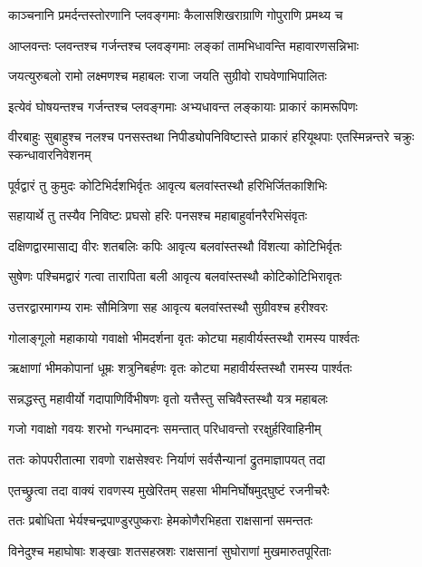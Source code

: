 \twolineshloka
{काञ्चनानि प्रमर्दन्तस्तोरणानि प्लवङ्गमाः}
{कैलासशिखराग्राणि गोपुराणि प्रमथ्य च} %

\twolineshloka
{आप्लवन्तः प्लवन्तश्च गर्जन्तश्च प्लवङ्गमाः}
{लङ्कां तामभिधावन्ति महावारणसन्निभाः} %

\twolineshloka
{जयत्युरुबलो रामो लक्ष्मणश्च महाबलः}
{राजा जयति सुग्रीवो राघवेणाभिपालितः} %

\twolineshloka
{इत्येवं घोषयन्तश्च गर्जन्तश्च प्लवङ्गमाः}
{अभ्यधावन्त लङ्कायाः प्राकारं कामरूपिणः} %

\threelineshloka
{वीरबाहुः सुबाहुश्च नलश्च पनसस्तथा}
{निपीड्योपनिविष्टास्ते प्राकारं हरियूथपाः}
{एतस्मिन्नन्तरे चक्रुः स्कन्धावारनिवेशनम्} %

\twolineshloka
{पूर्वद्वारं तु कुमुदः कोटिभिर्दशभिर्वृतः}
{आवृत्य बलवांस्तस्थौ हरिभिर्जितकाशिभिः} %

\twolineshloka
{सहायार्थे तु तस्यैव निविष्टः प्रघसो हरिः}
{पनसश्च महाबाहुर्वानरैरभिसंवृतः} %

\twolineshloka
{दक्षिणद्वारमासाद्य वीरः शतबलिः कपिः}
{आवृत्य बलवांस्तस्थौ विंशत्या कोटिभिर्वृतः} %

\twolineshloka
{सुषेणः पश्चिमद्वारं गत्वा तारापिता बली}
{आवृत्य बलवांस्तस्थौ कोटिकोटिभिरावृतः} %

\twolineshloka
{उत्तरद्वारमागम्य रामः सौमित्रिणा सह}
{आवृत्य बलवांस्तस्थौ सुग्रीवश्च हरीश्वरः} %

\twolineshloka
{गोलाङ्गूलो महाकायो गवाक्षो भीमदर्शना}
{वृतः कोट्या महावीर्यस्तस्थौ रामस्य पार्श्वतः} %

\twolineshloka
{ऋक्षाणां भीमकोपानां धूम्रः शत्रुनिबर्हणः}
{वृतः कोट्या महावीर्यस्तस्थौ रामस्य पार्श्वतः} %

\twolineshloka
{सन्नद्धस्तु महावीर्यो गदापाणिर्विभीषणः}
{वृतो यत्तैस्तु सचिवैस्तस्थौ यत्र महाबलः} %

\twolineshloka
{गजो गवाक्षो गवयः शरभो गन्धमादनः}
{समन्तात् परिधावन्तो ररक्षुर्हरिवाहिनीम्} %

\twolineshloka
{ततः कोपपरीतात्मा रावणो राक्षसेश्वरः}
{निर्याणं सर्वसैन्यानां द्रुतमाज्ञापयत् तदा} %

\twolineshloka
{एतच्छ्रुत्वा तदा वाक्यं रावणस्य मुखेरितम्}
{सहसा भीमनिर्घोषमुद्घुष्टं रजनीचरैः} %

\twolineshloka
{ततः प्रबोधिता भेर्यश्चन्द्रपाण्डुरपुष्कराः}
{हेमकोणैरभिहता राक्षसानां समन्ततः} %

\twolineshloka
{विनेदुश्च महाघोषाः शङ्खाः शतसहस्रशः}
{राक्षसानां सुघोराणां मुखमारुतपूरिताः} %

